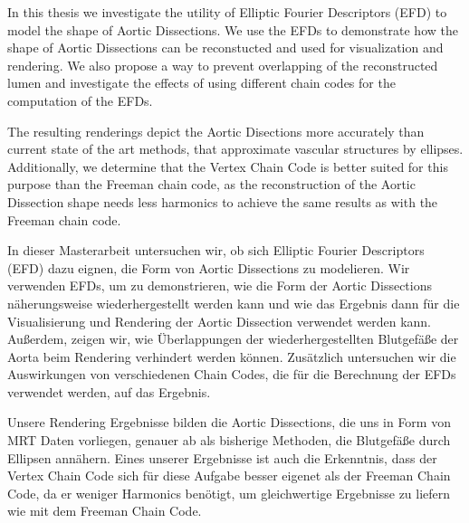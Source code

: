 \documentclass[thesis.tex]{subfiles}
\begin{document}

In this thesis we investigate the utility of Elliptic Fourier Descriptors (EFD) to model the shape of Aortic Dissections. We use the EFDs to demonstrate how the shape of Aortic Dissections can be reconstucted and used for visualization and rendering. We also propose a way to prevent overlapping of the reconstructed lumen and investigate the effects of using different chain codes for the computation of the EFDs.

The resulting renderings depict the Aortic Disections more accurately than current state of the art methods, that approximate vascular structures by ellipses. Additionally, we determine that the Vertex Chain Code is better suited for this purpose than the Freeman chain code, as the reconstruction of the Aortic Dissection shape needs less harmonics to achieve the same results as with the Freeman chain code.


In dieser Masterarbeit untersuchen wir, ob sich Elliptic Fourier Descriptors (EFD) dazu eignen, die Form von Aortic Dissections zu modelieren. Wir verwenden EFDs, um zu demonstrieren, wie die Form der Aortic Dissections näherungsweise wiederhergestellt werden kann und wie das Ergebnis dann für die Visualisierung und Rendering der Aortic Dissection verwendet werden kann. Außerdem, zeigen wir, wie Überlappungen der wiederhergestellten Blutgefäße der Aorta beim Rendering verhindert werden können. Zusätzlich untersuchen wir die Auswirkungen von verschiedenen Chain Codes, die für die Berechnung der EFDs verwendet werden, auf das Ergebnis. 

Unsere Rendering Ergebnisse bilden die Aortic Dissections, die uns in Form von MRT Daten vorliegen, genauer ab als bisherige Methoden, die Blutgefäße durch Ellipsen annähern. Eines unserer Ergebnisse ist auch die Erkenntnis, dass der Vertex Chain Code sich für diese Aufgabe besser eigenet als der Freeman Chain Code, da er weniger Harmonics benötigt, um gleichwertige Ergebnisse zu liefern wie mit dem Freeman Chain Code.
\end{document}
